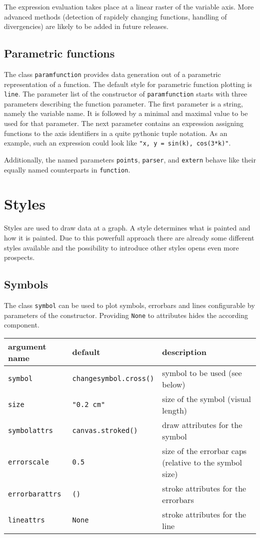 The expression evaluation takes place at a linear raster of the
variable axis. More advanced methods (detection of rapidely changing
functions, handling of divergencies) are likely to be added in future
releases.

\subsection{Parametric functions}

The class \verb|paramfunction| provides data generation out of a
parametric representation of a function. The default style for
parametric function plotting is \verb|line|. The parameter list of the
constructor of \verb|paramfunction| starts with three parameters
describing the function parameter. The first parameter is a string,
namely the variable name. It is followed by a minimal and maximal
value to be used for that parameter. The next parameter contains an
expression assigning functions to the axis identifiers in a quite
pythonic tuple notation. As an example, such an expression could look
like \verb|"x, y = sin(k), cos(3*k)"|.

Additionally, the named parameters \verb|points|, \verb|parser|, and
\verb|extern| behave like their equally named counterparts in
\verb|function|.

\section{Styles}
\label{graph:styles}

Styles are used to draw data at a graph. A style determines what is
painted and how it is painted. Due to this powerfull approach there
are already some different styles available and the possibility to
introduce other styles opens even more prospects.

\subsection{Symbols}

The class \verb|symbol| can be used to plot symbols, errorbars and lines
configurable by parameters of the constructor. Providing \verb|None|
to attributes hides the according component.

\medskip
\begin{tabularx}{\linewidth}{ll>{\raggedright\arraybackslash}X}
argument name&default&description\\
\hline
\texttt{symbol}&\texttt{changesymbol.cross()}&symbol to be used (see below)\\
\texttt{size}&\texttt{"0.2 cm"}&size of the symbol (visual length)\\
\texttt{symbolattrs}&\texttt{canvas.stroked()}&draw attributes for the symbol\\
\texttt{errorscale}&\texttt{0.5}&size of the errorbar caps (relative to the symbol size)\\
\texttt{errorbarattrs}&\texttt{()}&stroke attributes for the errorbars\\
\texttt{lineattrs}&\texttt{None}&stroke attributes for the line\\
\end{tabularx}
\medskip

